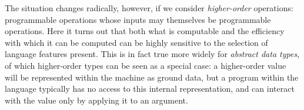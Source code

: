 \documentclass[12pt,phd,lfcs,twoside,openright,logo,leftchapter,normalheadings]{infthesis}
\theoremstyle{plain}
\theoremstyle{definition}
\begin{document}
The situation changes radically, however, if we consider
\emph{higher-order} operations: programmable operations whose inputs
may themselves be programmable operations.  Here it turns out that
both what is computable and the efficiency with which it can be
computed can be highly sensitive to the selection of language features
present. This is in fact true more widely for \emph{abstract data
  types}, of which higher-order types can be seen as a special case: a
higher-order value will be represented within the machine as ground
data, but a program within the language typically has no access to
this internal representation, and can interact with the value only by
applying it to an argument.

\end{document}
